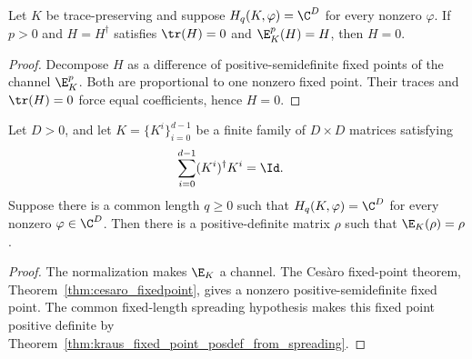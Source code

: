 \begin{theorem}
    \label{thm:kraus-hermitian-power-fixed-point-zero}
    \leanok
    Let $K$ be trace-preserving and suppose
    $H_q(K,\varphi)=\C^D$ for every nonzero $\varphi$. If $p>0$ and
    $H=H^\dagger$ satisfies $\tr(H)=0$ and $\E_K^p(H)=H$, then $H=0$.
\end{theorem}

\begin{proof}\leanok
    Decompose $H$ as a difference of positive-semidefinite fixed points of the
    channel $\E_K^p$. Both are proportional to one nonzero fixed point. Their
    traces and $\tr(H)=0$ force equal coefficients, hence $H=0$.
\end{proof}

\begin{theorem}
    \label{thm:kraus_posdef_fixed_point_from_tp_spreading}
    \leanok
    Let $D>0$, and let $K=\{K^i\}_{i=0}^{d-1}$ be a finite family of
    $D\times D$ matrices satisfying
    \begin{align}
        \sum_{i=0}^{d-1}(K^i)^\dagger K^i
         & =\Id.
        \notag
    \end{align}
    Suppose there is a common length $q\ge0$ such that
    $H_q(K,\varphi)=\C^D$ for every nonzero $\varphi\in\C^D$.
    Then there is a positive-definite matrix $\rho$ such that
    $\E_K(\rho)=\rho$.
\end{theorem}

\begin{proof}\leanok
    The normalization makes $\E_K$ a channel. The Ces\`aro fixed-point theorem,
    Theorem~\ref{thm:cesaro_fixedpoint}, gives a nonzero positive-semidefinite
    fixed point. The common fixed-length spreading hypothesis makes this fixed
    point positive definite by
    Theorem~\ref{thm:kraus_fixed_point_posdef_from_spreading}.
\end{proof}

